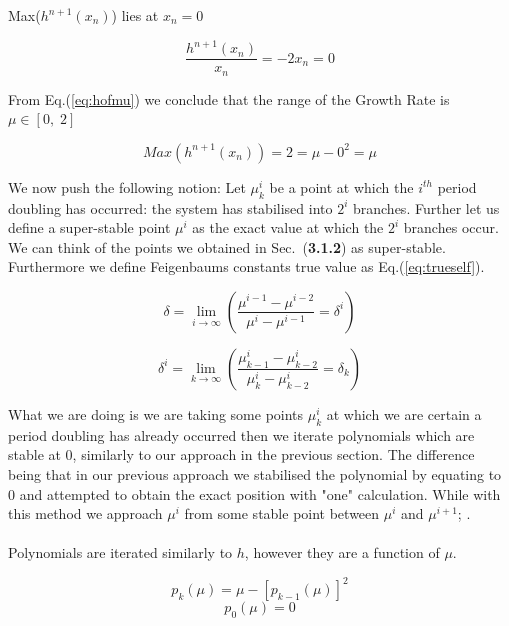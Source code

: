 Max($h^{n+1}(x_n)$) lies at $x_n = 0$

\begin{equation}
\frac{h^{n+1}(x_n)}{x_n} = - 2 x_n = 0 
\end{equation}

From Eq.(\ref{eq:hofmu}) we conclude that the range of the Growth Rate is $\mu \in [0,\;2]$

\begin{equation}
    \label{eq:hofmu}
    Max(h^{n+1}(x_n)) = 2 = \mu - 0^2 = \mu 
\end{equation}

We now push the following notion: Let $\mu_k^i$ be a point at which the $i^{th}$ period doubling has occurred:
the system has stabilised into $2^i$ branches. Further let us define a super-stable point $\mu^i$ as the exact value
at which the $2^i$ branches occur. We can think of the points we obtained in Sec.~(\textbf{3.1.2}) as super-stable.
Furthermore we define Feigenbaums constants true value as Eq.(\ref{eq:trueself}).

\begin{equation}
    \label{eq:trueself}
    \delta = \lim_{i \to \infty} \left( \frac{\mu^{i-1}-\mu^{i-2}}{\mu^{i}-\mu^{i-1}} = \delta^i \right)
\end{equation}

\begin{equation}
    \label{eq:trueself2}
    \delta^i = \lim_{k \to \infty} \left( \frac{\mu_{k-1}^{i}-\mu_{k-2}^{i}}{\mu_{k}^{i}-\mu_{k-2}^{i}} = \delta_k \right)
\end{equation}

What we are doing is we are taking some points $\mu_k^i$ at which we are certain a period doubling has already occurred
then we iterate polynomials which are stable at 0, similarly to our approach in the previous section. The difference
being that in our previous approach we stabilised the polynomial by equating to 0 and attempted to obtain the exact position
with "one" calculation. While with this method we approach $\mu^i$ from some stable point between $\mu^i$ and $\mu^{i+1}$; \cite{briggspc}.
\paragraph{}
Polynomials are iterated similarly to $h$, however they are a function of $\mu$.

\begin{equation}
p_k(\mu) = \mu - [p_{k-1}(\mu)]^2
\end{equation}
\begin{equation}
p_0(\mu) = 0 
\end{equation}

